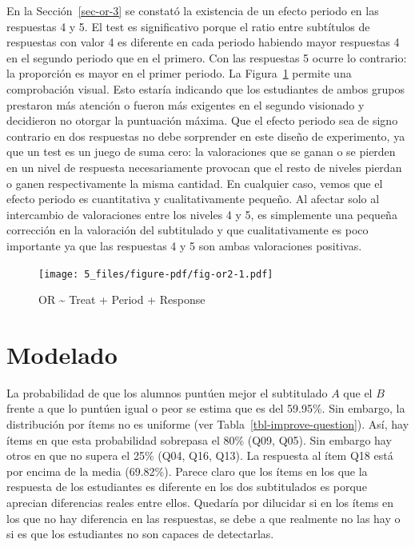 \documentclass[
  12pt,
  a4paper,
  extrafontsizes,
  onecolumn,
  openright,
  table]{memoir}
\begin{document}
En la Sección~\ref{sec-or-3} se constató la existencia de un efecto
periodo en las respuestas 4 y 5. El test es significativo porque el
ratio entre subtítulos de respuestas con valor 4 es diferente en cada
periodo habiendo mayor respuestas 4 en el segundo periodo que en el
primero. Con las respuestas 5 ocurre lo contrario: la proporción es
mayor en el primer periodo. La Figura~\ref{fig-or2} permite una
comprobación visual. Esto estaría indicando que los estudiantes de ambos
grupos prestaron más atención o fueron más exigentes en el segundo
visionado y decidieron no otorgar la puntuación máxima. Que el efecto
periodo sea de signo contrario en dos respuestas no debe sorprender en
este diseño de experimento, ya que un test es un juego de suma cero: la
valoraciones que se ganan o se pierden en un nivel de respuesta
necesariamente provocan que el resto de niveles pierdan o ganen
respectivamente la misma cantidad. En cualquier caso, vemos que el
efecto periodo es cuantitativa y cualitativamente pequeño. Al afectar
solo al intercambio de valoraciones entre los niveles 4 y 5, es
simplemente una pequeña corrección en la valoración del subtitulado y
que cualitativamente es poco importante ya que las respuestas 4 y 5 son
ambas valoraciones positivas.

\begin{figure}[h]

{\centering \texttt{[image: 5\_files/figure-pdf/fig-or2-1.pdf]}

}

\caption[Test Odds Ratio \textasciitilde{} Treat + Period +
Response]{\label{fig-or2}OR \textasciitilde{} Treat + Period + Response}

\end{figure}

\hypertarget{modelado-1}{%
\section{Modelado}\label{modelado-1}}

La probabilidad de que los alumnos puntúen mejor el subtitulado \(A\)
que el \(B\) frente a que lo puntúen igual o peor se estima que es del
59.95\%. Sin embargo, la distribución por ítems no es uniforme (ver
Tabla~\ref{tbl-improve-question}). Así, hay ítems en que esta
probabilidad sobrepasa el 80\% (Q09, Q05). Sin embargo hay otros en que
no supera el 25\% (Q04, Q16, Q13). La respuesta al ítem Q18 está por
encima de la media (69.82\%). Parece claro que los ítems en los que la
respuesta de los estudiantes es diferente en los dos subtitulados es
porque aprecian diferencias reales entre ellos. Quedaría por dilucidar
si en los ítems en los que no hay diferencia en las respuestas, se debe
a que realmente no las hay o si es que los estudiantes no son capaces de
detectarlas.
\end{document}
